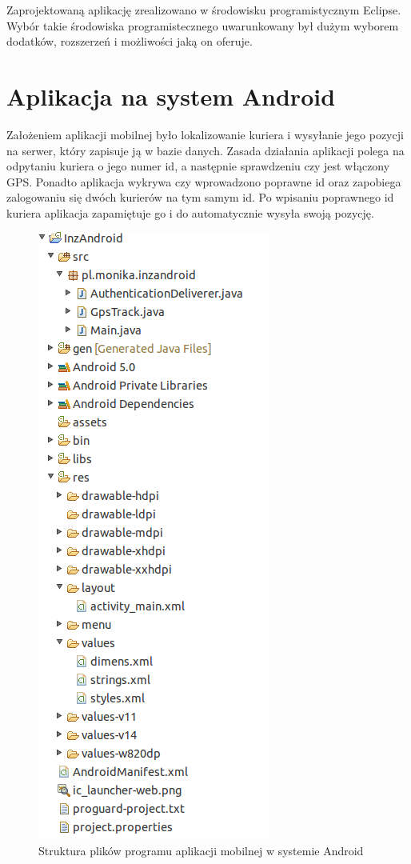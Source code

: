 \documentclass[eng,printmode,oneside]{mgr}
\begin{document}
Zaprojektowaną aplikację zrealizowano w środowisku programistycznym Eclipse.
Wybór takie środowiska programistecznego uwarunkowany był dużym wyborem
dodatków, rozszerzeń i możliwości jaką on oferuje.

\newpage
\section{Aplikacja na system Android}

Założeniem aplikacji mobilnej było lokalizowanie kuriera i wysyłanie jego
pozycji na serwer, który zapisuje ją w bazie danych. Zasada działania aplikacji
polega na odpytaniu kuriera o jego numer id, a następnie sprawdzeniu czy jest
włączony GPS. Ponadto aplikacja wykrywa czy wprowadzono poprawne id oraz
zapobiega zalogowaniu się dwóch kurierów na tym samym id. Po wpisaniu poprawnego
id kuriera aplikacja zapamiętuje go i do automatycznie wysyła swoją pozycję.

\begin{figure}
\vspace{-25pt}
\centering
\captionsetup{justification=centering,margin=0cm}
\begin{center}
\includegraphics[width=.4\textwidth]{struktura_android.png}
\end{center}
\caption{Struktura plików programu aplikacji mobilnej w systemie Android}
\label{fig:androidStruktura}
\end{figure}
\end{document}
